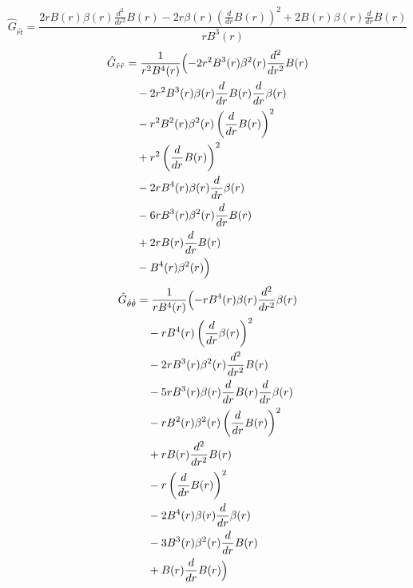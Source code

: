 \documentclass[11pt,a4paper]{article}
\begin{document}
\begin{dmath*}
  \hat{G}_{\hat{r}\hat{t}} = \frac{2 r B{\left(r \right)} \beta{\left(r \right)} \frac{d^{2}}{d r^{2}} B{\left(r \right)} - 2 r \beta{\left(r \right)} \left(\frac{d}{d r} B{\left(r \right)}\right)^{2} + 2 B{\left(r \right)} \beta{\left(r \right)} \frac{d}{d r} B{\left(r \right)}}{r B^{3}{\left(r \right)}}
\end{dmath*}
\begin{align*}
  \hat{G}_{\hat{r}\hat{r}} &= \frac{1}{r^{2} B^{4}{\left(r \right)}}\Bigl(- 2 r^{2} B^{3}{\left(r \right)} \beta^{2}{\left(r \right)} \frac{d^{2}}{d r^{2}} B{\left(r \right)} \\
  &\quad - 2 r^{2} B^{3}{\left(r \right)} \beta{\left(r \right)} \frac{d}{d r} B{\left(r \right)} \frac{d}{d r} \beta{\left(r \right)} \\
  &\quad - r^{2} B^{2}{\left(r \right)} \beta^{2}{\left(r \right)} \left(\frac{d}{d r} B{\left(r \right)}\right)^{2} \\
  &\quad + r^{2} \left(\frac{d}{d r} B{\left(r \right)}\right)^{2} \\
  &\quad - 2 r B^{4}{\left(r \right)} \beta{\left(r \right)} \frac{d}{d r} \beta{\left(r \right)} \\
  &\quad - 6 r B^{3}{\left(r \right)} \beta^{2}{\left(r \right)} \frac{d}{d r} B{\left(r \right)} \\
  &\quad + 2 r B{\left(r \right)} \frac{d}{d r} B{\left(r \right)} \\
  &\quad - B^{4}{\left(r \right)} \beta^{2}{\left(r \right)}\Bigr)
\end{align*}
\begin{align*}
  \hat{G}_{\hat{\theta}\hat{\theta}} &= \frac{1}{r B^{4}{\left(r \right)}}\Bigl(- r B^{4}{\left(r \right)} \beta{\left(r \right)} \frac{d^{2}}{d r^{2}} \beta{\left(r \right)} \\
  &\quad - r B^{4}{\left(r \right)} \left(\frac{d}{d r} \beta{\left(r \right)}\right)^{2} \\
  &\quad - 2 r B^{3}{\left(r \right)} \beta^{2}{\left(r \right)} \frac{d^{2}}{d r^{2}} B{\left(r \right)} \\
  &\quad - 5 r B^{3}{\left(r \right)} \beta{\left(r \right)} \frac{d}{d r} B{\left(r \right)} \frac{d}{d r} \beta{\left(r \right)} \\
  &\quad - r B^{2}{\left(r \right)} \beta^{2}{\left(r \right)} \left(\frac{d}{d r} B{\left(r \right)}\right)^{2} \\
  &\quad + r B{\left(r \right)} \frac{d^{2}}{d r^{2}} B{\left(r \right)} \\
  &\quad - r \left(\frac{d}{d r} B{\left(r \right)}\right)^{2} \\
  &\quad - 2 B^{4}{\left(r \right)} \beta{\left(r \right)} \frac{d}{d r} \beta{\left(r \right)} \\
  &\quad - 3 B^{3}{\left(r \right)} \beta^{2}{\left(r \right)} \frac{d}{d r} B{\left(r \right)} \\
  &\quad + B{\left(r \right)} \frac{d}{d r} B{\left(r \right)}\Bigr)
\end{align*}
\end{document}
